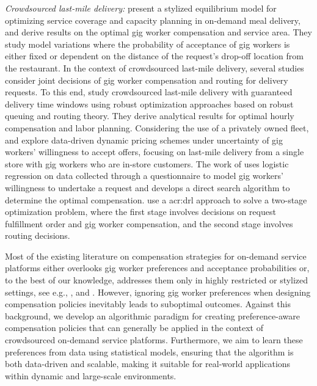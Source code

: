 \noindent \textit{Crowdsourced last-mile delivery:}
\cite{yildiz2019service} present a stylized equilibrium model for optimizing service coverage and capacity planning in on-demand meal delivery, and derive results on the optimal gig worker compensation and service area. They study model variations where the probability of acceptance of gig workers is either fixed or dependent on the distance of the request's drop-off location from the restaurant. In the context of crowdsourced last-mile delivery, several studies consider joint decisions of gig worker compensation and routing for delivery requests. To this end, \cite{fatehi2022crowdsourcing} study crowdsourced last-mile delivery with guaranteed delivery time windows using robust optimization approaches based on robust queuing and routing theory. They derive analytical results for optimal hourly compensation and labor planning. Considering the use of a privately owned fleet, \cite{barbosa2023data} and \cite{silva2022deep} explore data-driven dynamic pricing schemes under uncertainty of gig workers' willingness to accept offers, focusing on last-mile delivery from a single store with gig workers who are in-store customers. The work of \cite{barbosa2023data} uses logistic regression on data collected through a questionnaire to model gig workers' willingness to undertake a request and develops a direct search algorithm to determine the optimal compensation. \cite{silva2022deep} use a \gls{acr:drl} approach to solve a two-stage optimization problem, where the first stage involves decisions on request fulfillment order and gig worker compensation, and the second stage involves routing decisions.  

Most of the existing literature on compensation strategies for on-demand service platforms either overlooks gig worker preferences and acceptance probabilities or, to the best of our knowledge, addresses them only in highly restricted or stylized settings, see e.g., \cite{yildiz2019service}, \cite{barbosa2023data} and \cite{silva2022deep}. However, ignoring gig worker preferences when designing compensation policies inevitably leads to suboptimal outcomes. Against this background, we develop an algorithmic paradigm for creating preference-aware compensation policies that can generally be applied in the context of crowdsourced on-demand service platforms. Furthermore, we aim to learn these preferences from data using statistical models, ensuring that the algorithm is both data-driven and scalable, making it suitable for real-world applications within dynamic and large-scale environments.

